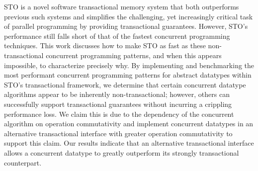 STO is a novel software transactional memory system that both outperforms previous such systems and simplifies the challenging, yet increasingly critical task of parallel programming by providing transactional guarantees. 
However, STO's performance still falls short of that of the fastest concurrent programming techniques. This work discusses how to make STO as fast as these non-transactional concurrent programming patterns, and when this appears impossible, to characterize precisely why. By implementing and benchmarking the most performant concurrent programming patterns for abstract datatypes within STO's transactional framework, we determine that certain concurrent datatype algorithms appear to be inherently non-transactional; however, others can successfully support transactional guarantees without incurring a crippling performance loss. We claim this is due to the dependency of the concurrent algorithm on operation commutativity and implement concurrent datatypes in an alternative transactional interface with greater operation commutativity to support this claim. Our results indicate that an alternative transactional interface allows a concurrent datatype to greatly outperform its strongly transactional counterpart.
